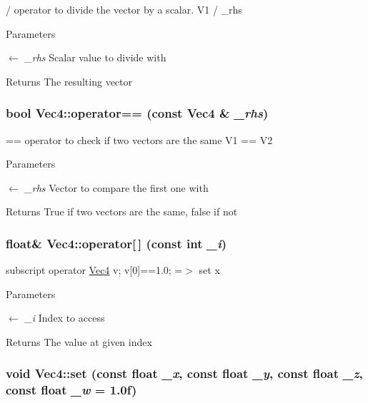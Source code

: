 / operator to divide the vector by a scalar. V1 / \_\-rhs 
\begin{DoxyParams}{Parameters}
\item[\mbox{$\leftarrow$} {\em \_\-rhs}]Scalar value to divide with \end{DoxyParams}
\begin{DoxyReturn}{Returns}
The resulting vector 
\end{DoxyReturn}
\hypertarget{classVec4_aa34841d8ecafffb09c3d01e028e0b09e}{
\subsubsection[{operator==}]{\setlength{\rightskip}{0pt plus 5cm}bool Vec4::operator== (const {\bf Vec4} \& {\em \_\-rhs})}}
\label{classVec4_aa34841d8ecafffb09c3d01e028e0b09e}


== operator to check if two vectors are the same V1 == V2 
\begin{DoxyParams}{Parameters}
\item[\mbox{$\leftarrow$} {\em \_\-rhs}]Vector to compare the first one with \end{DoxyParams}
\begin{DoxyReturn}{Returns}
True if two vectors are the same, false if not 
\end{DoxyReturn}
\hypertarget{classVec4_abc23f7a2a8788cd4ba1bb990f3ad51e4}{
\subsubsection[{operator[]}]{\setlength{\rightskip}{0pt plus 5cm}float\& Vec4::operator\mbox{[}$\,$\mbox{]} (const int {\em \_\-i})}}
\label{classVec4_abc23f7a2a8788cd4ba1bb990f3ad51e4}


subscript operator \hyperlink{classVec4}{Vec4} v; v\mbox{[}0\mbox{]}==1.0; =$>$ set x 
\begin{DoxyParams}{Parameters}
\item[\mbox{$\leftarrow$} {\em \_\-i}]Index to access \end{DoxyParams}
\begin{DoxyReturn}{Returns}
The value at given index 
\end{DoxyReturn}
\hypertarget{classVec4_a48e70640181547614a4d72be0dcb9a35}{
\subsubsection[{set}]{\setlength{\rightskip}{0pt plus 5cm}void Vec4::set (const float {\em \_\-x}, \/  const float {\em \_\-y}, \/  const float {\em \_\-z}, \/  const float {\em \_\-w} = {\ttfamily 1.0f})}}
\label{classVec4_a48e70640181547614a4d72be0dcb9a35}



